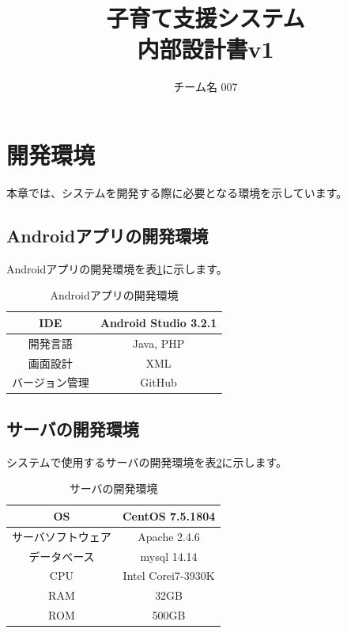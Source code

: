 \documentclass[a4j]{jarticle}
\title{
\vspace{30mm}
{\bf 子育て支援システム}
\\
\vspace{5mm}
{\bf 内部設計書v1\\
}
\vspace{120mm}
}
\author{
\vspace{5mm}
チーム名 007\\
\vspace{5mm}
}
\begin{document}
\maketitle
\tableofcontents
\newpage

\section{開発環境}
本章では、システムを開発する際に必要となる環境を示しています。

\subsection{Androidアプリの開発環境}
Androidアプリの開発環境を表\ref{Application_Development_Environment}に示します。

\begin{table}[H]
    \caption{Androidアプリの開発環境}
    \label{Application_Development_Environment}
    \begin{center}
        \begin{tabular}{|c||c|} \hline
            IDE & Android Studio 3.2.1 \\ \hline
            開発言語 & Java, PHP \\ \hline
            画面設計 & XML \\ \hline
            バージョン管理 & GitHub \\ \hline
        \end{tabular}
    \end{center}
\end{table}

\subsection{サーバの開発環境}
システムで使用するサーバの開発環境を表\ref{Server_Development_Environment}に示します。
\begin{table}[H]
    \caption{サーバの開発環境}
    \label{Server_Development_Environment}
    \begin{center}
        \begin{tabular}{|c||c|} \hline
            OS & CentOS 7.5.1804 \\ \hline
            サーバソフトウェア & Apache 2.4.6 \\ \hline
            データベース & mysql 14.14 \\ \hline
            CPU & Intel Corei7-3930K \\ \hline
            RAM & 32GB \\ \hline
            ROM & 500GB \\ \hline
        \end{tabular}
    \end{center}
\end{table}
\end{document}
